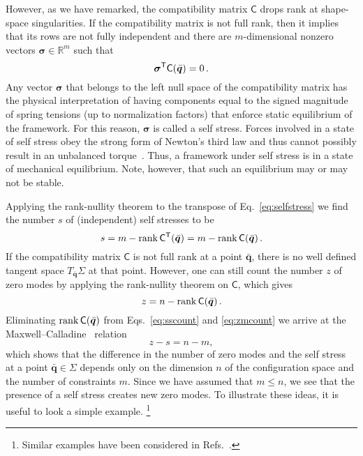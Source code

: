 However, as we have remarked, the compatibility matrix $\mathsf{C}$ drops rank at shape-space singularities.
If the compatibility matrix is not full rank, then it implies that its rows are not fully independent and there are $m$-dimensional nonzero vectors $\bm{\sigma} \in \mathbb{R}^m$ such that
%
\begin{equation}
  \bm{\sigma}^\mathsf{T}\mathsf{C}(\bar{\bm{q}}) = 0\,.\label{eq:selfstress}
\end{equation}
%
Any vector $\bm{\sigma}$ that belongs to the left null space of the compatibility matrix has the physical interpretation of having components equal to the signed magnitude of spring tensions (up to normalization factors) that enforce static equilibrium of the framework.
For this reason, $\bm{\sigma}$ is called a self stress.
Forces involved in a state of self stress obey the strong form of Newton's third law and thus cannot possibly result in an unbalanced torque~\cite{goldstein2002}.
Thus, a framework under self stress is in a state of mechanical equilibrium.
Note, however, that such an equilibrium may or may not be stable.

Applying the rank-nullity theorem to the transpose of Eq.~\eqref{eq:selfstress} we find the number $s$ of (independent) self stresses to be
%
\begin{equation}
  s = m - \operatorname{rank}{\mathsf{C}^\mathsf{T}(\bar{\bm{q}})} = m - \operatorname{rank}{\mathsf{C}(\bar{\bm{q}})}\,.\label{eq:sscount}
\end{equation}
%
If the compatibility matrix $\mathsf{C}$ is not full rank at a point $\bar{\bm{q}}$, there is no well defined tangent space $T_{\bar{\bm{q}}}\Sigma$ at that point.
However, one can still count the number $z$ of zero modes by applying the rank-nullity theorem on $\mathsf{C}$, which gives
\begin{equation}
  z = n - \operatorname{rank}{\mathsf{C}(\bar{\bm{q}})}\label{eq:zmcount}\,.
\end{equation}
Eliminating $\operatorname{rank}{\mathsf{C}(\bar{\bm{q}})}$ from Eqs.~\eqref{eq:sscount} and \eqref{eq:zmcount} we arrive at the Maxwell--Calladine~\cite{maxwell1864,calladine1978} relation
%
\begin{equation}
  z - s = n - m,
  \label{eq:mcindex}
\end{equation}
%
which shows that the difference in the number of zero modes and the self stress at a point $\bar{\bm{q}} \in \Sigma$ depends only on the dimension $n$ of the configuration space and the number of constraints $m$.
Since we have assumed that $m \leq n$, we see that the presence of a self stress creates new zero modes.
To illustrate these ideas, it is useful to look a simple example.%
\footnote{Similar examples have been considered in Refs.~\cite{calladine1978,lengyel2002,zhang2016,woodhouse2018}.}

